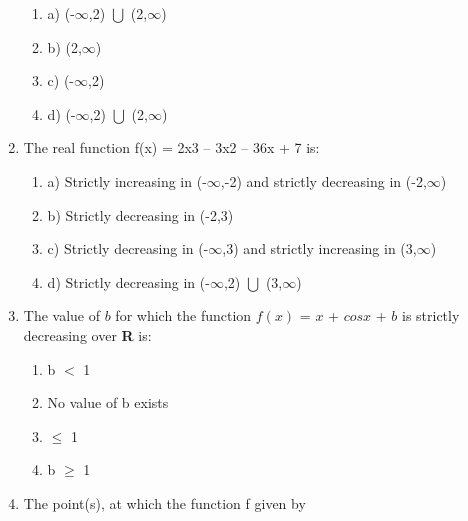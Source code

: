 \documentclass{article}
\begin{document}
\begin{enumerate}
\begin{enumerate}

     \item a) (-$\infty$,2) $\bigcup$ (2,$\infty$) 
     
     \item b) (2,$\infty$) 

     \item c) (-$\infty$,2) 

     \item d) (-$\infty$,2) $\bigcup$ (2,$\infty$) 

\end{enumerate}


\newpage

\item The real function f(x) = 2x3 – 3x2 – 36x + 7 is:

\begin{enumerate}

     \item a) Strictly increasing in (-$\infty$,-2) and strictly decreasing in (-2,$\infty$)
     
     \item b) Strictly decreasing in (-2,3) 

     \item c) Strictly decreasing in (-$\infty$,3) and strictly increasing in (3,$\infty$) 

     \item d) Strictly decreasing in (-$\infty$,2) $\bigcup$ (3,$\infty$) 

\end{enumerate}


\item The value of $b$  for which the function $f(x)$ = $x$ + $cosx$ + $b$ is strictly decreasing over \textbf{R} is:
\begin{enumerate}

     \item b $<$ 1 
     
     \item No value of b exists 

     \item $\leq$ 1 

     \item b $\geq$ 1 

\end{enumerate}

\item The point(s), at which the function f given by  


\end{enumerate}
\end{document}
